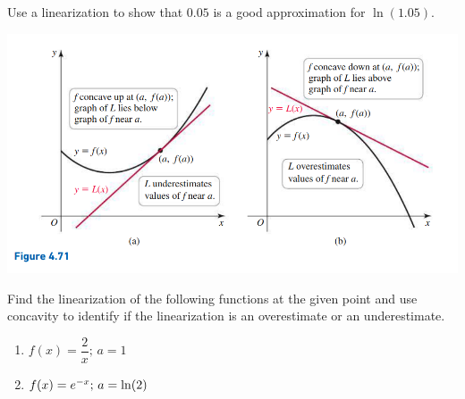\documentclass[answers]{exam}
\begin{document}
\begin{ex*}
  Use a linearization to show that $0.05$ is a good approximation for $\ln(1.05)$.
\end{ex*}
\pagebreak
\noindent
{}
\begin{center}
    \includegraphics[scale=0.5]{images/briggs_04_06/fig4_71}
\end{center}

\begin{ex*}
  Find the linearization of the following functions at the given point and use concavity to identify if the linearization is an overestimate or an underestimate.
\end{ex*}
\begin{enumerate}[label=\alph*),itemsep=\stretch{1}]
  \item $f(x)=\dfrac{2}{x};\, a=1$
  \item $f(x)=e\inv[x];\, a=\ln(2)$
\end{enumerate}
\pagebreak

\end{document}
